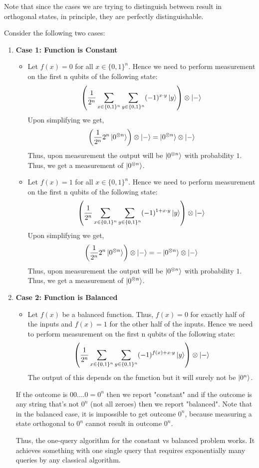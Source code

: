 Note that since the cases we are trying to distinguish between result in orthogonal states, in principle, they are perfectly distinguishable.

Consider the following two cases:
\begin{enumerate}
    \item \textbf{Case 1: Function is Constant}
    \begin{itemize}
        \item Let $f(x)=0$ for all $x \in \{0,1\}^n$. Hence we need to perform measurement on the first n qubits of the following state:
        \[
            \left(\frac{1}{2^n}\sum_{x \in \{0,1\}^n}\sum_{y \in \{0,1\}^n}(-1)^{x\cdot y}\ket{y}\right)\otimes \ket{-}
        \]
        Upon simplifying we get,
        \[
            \left(\frac{1}{2^n}2^n\ket{0^{\otimes n}}\right)\otimes \ket{-} = \ket{0^{\otimes n}} \otimes \ket{-}
        \]
        Thus, upon measurement the output will be $\ket{0^{\otimes n}}$ with probability $1$. Thus, we get a measurement of $\ket{0^{\otimes n}}$.
        \item Let $f(x)=1$ for all $x \in \{0,1\}^n$. Hence we need to perform measurement on the first n qubits of the following state:
        \[
            \left(\frac{1}{2^n}\sum_{x \in \{0,1\}^n}\sum_{y \in \{0,1\}^n}(-1)^{1+x\cdot y}\ket{y}\right)\otimes \ket{-}
        \]
        Upon simplifying we get,
        \[
            \left(\frac{1}{2^n}2^n\ket{0^{\otimes n}}\right)\otimes \ket{-} = -\ket{0^{\otimes n}} \otimes \ket{-}
        \]
        Thus, upon measurement the output will be $\ket{0^{\otimes n}}$ with probability $1$. Thus, we get a measurement of $\ket{0^{\otimes n}}$.
    \end{itemize}
    \item \textbf{Case 2: Function is Balanced}
    \begin{itemize}
        \item Let $f(x)$ be a balanced function. Thus, $f(x)=0$ for exactly half of the inputs and $f(x)=1$ for the other half of the inputs. Hence we need to perform measurement on the first n qubits of the following state:
        \[
            \left(\frac{1}{2^n}\sum_{x \in \{0,1\}^n}\sum_{y \in \{0,1\}^n}(-1)^{f(x)+x\cdot y}\ket{y}\right)\otimes \ket{-}
        \]
        The output of this depends on the function but it will surely not be $\ket{0^n}$.
    \end{itemize}
     If the outcome is $00.\ldots 0=0^n$ then we report "constant" and if the outcome is any string that's not $0^n$ (not all zeroes) then we report "balanced". Note that in the balanced case, it is impossible to get outcome $0^n$, because measuring a state orthogonal to $0^n$ cannot result in outcome $0^n$.

     Thus, the one-query algorithm for the constant vs balanced problem works. It achieves something with one single query that requires exponentially many queries by any classical algorithm.
\end{enumerate}

